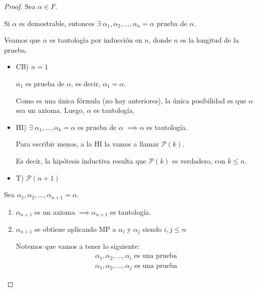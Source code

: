 \begin{proof} \phantom{.}
    
    Sea $\alpha \in F$.

    Si $\alpha$ es demostrable, entonces $\exists \; \alpha_1,
    \alpha_2, \dotsc, \alpha_n=\alpha$ prueba de $\alpha$.

    Veamos que $\alpha$ es tautología por inducción en $n$, donde $n$ es la 
    longitud de la prueba.

    \begin{itemize}
        \item CB) $n=1$

            $\alpha_1$ es prueba de $\alpha$, es decir, $\alpha_1=\alpha$.

            Como es una única fórmula (no hay anteriores), la única 
            posibilidad es que $\alpha$ sea un axioma. Luego, $\alpha$ es
            tautología.

        \item HI) $\exists \; \alpha_1, \dotsc, \alpha_k = \alpha$ es prueba 
            de $\alpha$ $\implies \alpha$ es tautología.

            Para escribir menos, a la HI la vamos a llamar $\mathcal{P}(k)$.

            Es decir, la hipótesis inductiva resulta que $\mathcal{P}(k)$ es
            verdadero, con $k \leq n$.

        \item T) $\mathcal{P}(n+1)$
    \end{itemize}
    

    Sea $\alpha_1, \alpha_2, \dotsc, \alpha_{n+1} = \alpha$.

    \begin{enumerate}[%
                    labelindent=*,
                    style=multiline,
                    leftmargin=*,
                    align=left,
                    leftmargin=2\parindent,
                    label=Caso \arabic*)]
        \item $\alpha_{n+1}$ es un axioma $\implies \alpha_{n+1}$  es 
            tautología.

        \item $\alpha_{n+1}$ se obtiene aplicando MP a $\alpha_i$ y $\alpha_j$
            siendo $i, j \leq n$

            Notemos que vamos a tener lo siguiente:
            \begin{gather*}
                \alpha_1, \alpha_2, \dotsc, \alpha_i \text{ es una prueba}\\
                \alpha_1, \alpha_2, \dotsc, \alpha_j \text{ es una prueba}
            \end{gather*}


\end{enumerate}
\end{proof}
